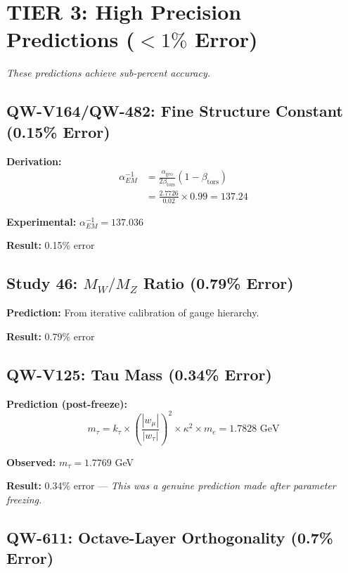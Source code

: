 \documentclass[11pt, a4paper]{article}
\theoremstyle{remark}
\newcommand{\alphageo}{\alpha_{\text{geo}}}
\newcommand{\betators}{\beta_{\text{tors}}}
\begin{document}
\section{TIER 3: High Precision Predictions ($<1\%$ Error)}

\textit{These predictions achieve sub-percent accuracy.}

\subsection{QW-V164/QW-482: Fine Structure Constant (0.15\% Error)}

\textbf{Derivation:}
\begin{align}
\alpha_{EM}^{-1} &= \frac{\alphageo}{2\betators}(1 - \betators) \\
&= \frac{2.7726}{0.02} \times 0.99 = \boxed{137.24}
\end{align}

\textbf{Experimental:} $\alpha_{EM}^{-1} = 137.036$

\textbf{Result:} 0.15\% error

\subsection{Study 46: $M_W/M_Z$ Ratio (0.79\% Error)}

\textbf{Prediction:} From iterative calibration of gauge hierarchy.

\textbf{Result:} 0.79\% error

\subsection{QW-V125: Tau Mass (0.34\% Error)}

\textbf{Prediction (post-freeze):}
\begin{equation}
m_\tau = k_\tau \times \left(\frac{|w_\mu|}{|w_\tau|}\right)^2 \times \kappa^2 \times m_e = 1.7828 \text{ GeV}
\end{equation}

\textbf{Observed:} $m_\tau = 1.7769$ GeV

\textbf{Result:} 0.34\% error --- \textit{This was a genuine prediction made after parameter freezing.}

\subsection{QW-611: Octave-Layer Orthogonality (0.7\% Error)}
\end{document}
